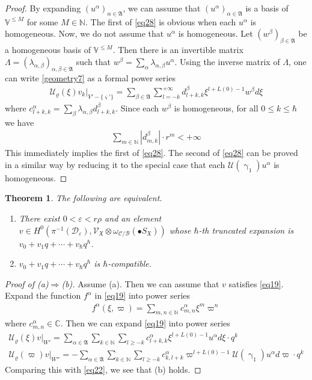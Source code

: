 \documentclass[11pt,b5paper,notitlepage]{article}
\theoremstyle{definition}
\theoremstyle{plain}
\newtheorem{thm}[df]{Theorem}
\newcommand{\fk}{\mathfrak}
\newcommand{\mc}{\mathcal}
\newcommand{\scr}{\mathscr}
\newcommand{\sgm}{\varsigma}
\newcommand{\SX}{{S_{\fk X}}}
\newcommand{\blt}{\bullet}
\newcommand{\Vbb}{\mathbb V}
\newcommand{\Cbb}{\mathbb C}
\newcommand{\Nbb}{\mathbb N}
\newcommand{\<}{\left\langle}
\renewcommand{\>}{\right\rangle}
\newcommand{\MU}{\mathcal{U}}
\newcommand{\MC}{\mathcal{C}}
\newcommand{\MB}{\mathcal{B}}
\newcommand{\fx}{\mathfrak{X}}
\newcommand{\MD}{\mathcal{D}}
\newcommand{\eps}{\varepsilon}
\numberwithin{equation}{section}
\begin{document}
\begin{proof}
By expanding $(u^\alpha)_{\alpha\in\fk A}$, we can assume that $(u^\alpha)_{\alpha\in\fk A}$ is a basis of $\Vbb^{\leq M}$ for some $M\in\Nbb$. The first of \eqref{eq28} is obvious when each $u^\alpha$ is homogeneous. Now, we do not assume that $u^\alpha$ is homogeneous. Let $(w^\beta)_{\beta\in\fk A}$ be a homogeneous basis of $\Vbb^{\leq M}$. Then there is an invertible matrix $\Lambda=(\lambda_{\alpha,\beta})_{\alpha,\beta\in\fk A}$ such that $w^\beta=\sum_\alpha \lambda_{\alpha,\beta}u^\alpha$. Using the inverse matrix of $\Lambda$, one can write \eqref{geometry7} as a formal power series
\begin{align*}
\MU_\varrho(\xi)v_k\big|_{V'-\{\sgm'\}}=\sum_{\beta\in\fk A}\sum_{l= -k}^{+\infty}d_{l+k,k}^\beta\xi^{l+L(0)-1}w^\beta d\xi
\end{align*}
where $c^\alpha_{l+k,k}=\sum_\beta \lambda_{\alpha,\beta}d^\beta_{l+k,k}$. Since each $w^\beta$ is homogeneous, for all $0\leq k\leq\hbar$ we have
\begin{align*}
\sum_{m\in\Nbb}|d^\beta_{m,k}|\cdot r^m<+\infty
\end{align*}
This immediately implies the first of \eqref{eq28}. The second of \eqref{eq28} can be proved in a similar way by reducing it to the special case that each $\mc U(\upgamma_1)u^\alpha$ is homogeneous.
\end{proof}



    
\begin{thm}\label{geometry1}
The following are equivalent.
\begin{enumerate}[label=(\alph*)]
\item There exist $0<\eps<r\rho$ and an element $v\in H^0(\pi^{-1}(\MD_\eps),\scr V_\fx\otimes\omega_{\MC/\MB}(\blt\SX))$ whose $\hbar$-th truncated expansion is $v_0+v_1q+\cdots+ v_\hbar q^\hbar$.
\item $v_0+v_1q+\cdots +v_\hbar q^\hbar$ is $\hbar$-compatible.
\end{enumerate}
\end{thm}

\begin{proof}[Proof of (a)$\Rightarrow$(b)]
Assume (a). Then we can assume that $v$ satisfies \eqref{eq19}. Expand the function $f^\alpha$ in \eqref{eq19} into power series
\begin{align*}
f^\alpha(\xi,\varpi)=\sum_{m,n\in\Nbb}c^\alpha_{m,n}\xi^m\varpi^n
\end{align*}
where $c^\alpha_{m,n}\in\Cbb$. Then we can expand \eqref{eq19} into power series
\begin{subequations}
\begin{gather*}
\MU_\varrho(\xi)v\big|_{W'}=\sum_{\alpha\in\fk A}\sum_{k\in\Nbb}\sum_{l\geq -k}c_{l+k,k}^\alpha\xi^{l+L(0)-1}u^\alpha d\xi\cdot q^k  \\[0.5ex]
\MU_\varrho(\varpi)v\big|_{W''}=-\sum_{\alpha\in\fk A}\sum_{k\in\Nbb}\sum_{l\geq -k}c_{k,l+k}^\alpha\varpi^{l+L(0)-1}\MU(\upgamma_1)u^\alpha d\varpi \cdot q^k
\end{gather*}
\end{subequations}
Comparing this with \eqref{eq22}, we see that (b) holds.
\end{proof}
\end{document}

